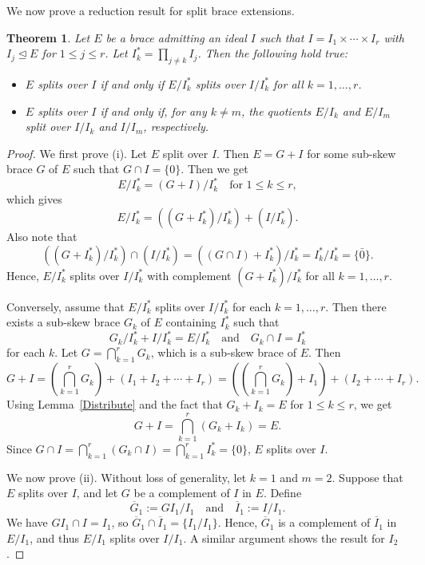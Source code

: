 \documentclass[11pt]{amsart}
\theoremstyle{thrm}
\theoremstyle{plain}
\newtheorem{thm}{Theorem}[section]
\theoremstyle{definition}
\numberwithin{equation}{section}
\begin{document}
We now prove a reduction result for split brace extensions.
\begin{thm}\label{thm1}
	 Let $E$ be a brace  admitting an ideal  $I$ such that $I = I_1 \times \cdots \times I_r$ with $I_j \trianglelefteq E$ for $1 \leq j \leq r$. Let $I_k^* = \prod_{j \neq k} I_j$. Then the following  hold true:
\begin{itemize}
	\item[(i)] $E$ splits over $I$ if and only if $E/I_k^*$ splits over $I/I_k^*$ for all $k = 1, \ldots, r$.
	\item[(ii)]  $E$ splits over $I$ if and only if, for any $k \neq m$, the quotients $E/I_k$ and $E/I_m$ split over $I/I_k$ and $I/I_m$, respectively.
\end{itemize}
\end{thm}
\begin{proof}
We first prove (i).   Let $E$  split over $I$. Then $E = G + I$ for some sub-skew brace $G$ of $E$ such that $G \cap I = \{0\}$. Then we get
\[
E / I_k^* =( G+I) / I_k^* \quad \text{for } 1 \leq k \leq r,
\]
which gives
\[
E / I_k^*   = ((G + I_k^*) / I_k^*) + (I / I_k^*).
\]
Also note that
\[
((G + I_k^*) / I_k^*) \cap (I / I_k^*) = ((G \cap I) + I_k^*) / I_k^* = I_k^* / I_k^* = \{\bar{0}\}.
\]
Hence, $E / I_k^*$  splits over $I / I_k^*$ with complement  $(G + I_k^*) / I_k^*$ for all $k = 1, \ldots, r$.

Conversely, assume  that $E / I_k^*$ splits over $I / I_k^*$ for each $k = 1, \ldots, r$. Then there exists a sub-skew brace $G_k$ of $E$ containing $I_k^*$ such that 
\[
G_k/ I_k^* +  I / I_k^* = E / I_k^*
\quad \text{and} \quad
G_k \cap I = I_k^*
\]
for each $k$.  Let $G = \bigcap_{k=1}^r G_k$, which is a sub-skew brace of $E$. Then
\[
G + I = \left( \bigcap_{k=1}^r G_k \right) + (I_1 + I_2 + \cdots + I_r)=\left( \left( \bigcap_{k=1}^r G_k \right) + I_1\right)+ (I_2 +  \cdots + I_r).
\]
Using Lemma~\ref{Distribute} and the fact that $G_k + I_k = E$ for $1 \le k \le r$, we get
\[
G + I = \bigcap_{k=1}^r (G_k  + I_k) = E.
\]
Since $G \cap I = \bigcap_{k=1}^r (G_k \cap I) = \bigcap_{k=1}^r I_k^* = \{0\}$,  $E$ splits over $I$.

We now prove (ii). Without loss of generality, let \( k = 1 \) and \( m = 2 \). Suppose that \( E \) splits over \( I \), and let \( G \) be a complement of \( I \) in \( E \). Define
\[
\overline{G}_1 := GI_1 / I_1 \quad \text{and} \quad \overline{I}_1 := I / I_1.
\]
We have \( GI_1 \cap I = I_1 \), so \( \overline{G}_1 \cap \overline{I}_1 = \{I_1/I_1\} \). Hence, \( \overline{G}_1 \) is a complement of \( \overline{I}_1 \) in \( E / I_1 \), and thus \( E / I_1 \) splits over \( I / I_1 \). A similar argument shows the result for \( I_2 \).


\end{proof}
\end{document}
